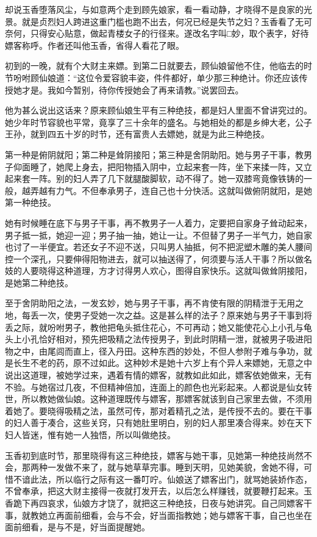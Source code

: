 \documentclass[a4paper,12pt,UTF8,twoside]{ctexbook}
\begin{document}
却说玉香堕落风尘，与如意两个走到顾先娘家，看一看动静，才晓得不是良家的光景。就是贞烈妇人跨进这重门槛也跑不出去，何况已经是失节之妇？玉香看了无可奈何，只得安心贴意，做起青楼女子的行径来。遂改名字叫□妙，取个表字，好待嫖客称呼。作者还叫他玉香，省得人看花了眼。

初到的一晚，就有个大财主来嫖。到第二日就要去，顾仙娘留他不住，他临去的时节吩咐顾仙娘道：“这位令爱容貌丰姿，件件都好，单少那三种绝计。你还应该传授她才是。我如今暂别，待你传授她会了再来请教。”说罢回去。

他为甚么说出这话来？原来顾仙娘生平有三种绝技，都是妇人里面不曾讲究过的。她少年时节容貌也平常，竟享了三十余年的盛名。与她相处的都是乡绅大老，公子王孙，就到四五十岁的时节，还有富贵人去嫖她，就是为此三种绝技。

第一种是俯阴就阳；第二种是耸阴接阳；第三种是舍阴助阳。她与男子干事，教男子仰面睡了，她爬上身去，把阳物插入阴中，立起来套一阵，坐下来揉一阵，又立起来套一阵。别的妇人弄了几下就腿酸脚软，动不得了。她一双膝弯竟像铁铸的一般，越弄越有力气。不但奉承男子，连自己也十分快活。这就叫做俯阴就阳，是她第一种绝技。

她有时候睡在底下与男子干事，再不教男子一人着力，定要把自家身子耸动起来，男子抵一抵，她迎一迎；男子抽一抽，她让一让。不但替了男子一半气力，她自家也讨了一半便宜。若还女子不迎不送，只叫男人抽抵，何不把泥塑木雕的美人腰间控一个深孔，只要伸得阳物进去，就可以抽送得了，何须要与活人干事？所以做名妓的人要晓得这种道理，方才讨得男人欢心，图得自家快乐。这就叫做耸阴接阳，是她第二种绝技。

至于舍阴助阳之法，一发玄妙，她与男子干事，再不肯使有限的阴精泄于无用之地，每丢一次，使男子受她一次之益。这是甚么样的法子？原来她与男子干事到将丢之际，就吩咐男子，教他把龟头抵住花心，不可再动；她又能使花心上小孔与龟头上小孔恰好相对，预先把吸精之法传授男子，到此时阴精一泄，就被男子吸进阳物之中，由尾闾而直上，径入丹田。这种东西的妙处，不但人参附子难与争功，就是长生不老的药，原不过如此。这种妙术是她十六岁上有个异人来嫖她，无意之中说出这道理，被她学过来，遇着有情的嫖客，就教如此如此，嫖客依她做来，无有不验。与她宿过几夜，不但精神倍加，连面上的颜色也光彩起来。人都说是仙女转世，所以教她做仙娘。这种道理既传与嫖客，那嫖客就该到自己家里去做，不须用着她了。要晓得吸精之法，虽然可传，那对着精孔之法，是传授不去的。要在干事的妇人善于凑合，这些关窍，只有她肚里明白，别的妇人那里凑合得来。妙在天下妇人皆迷，惟有她一人独悟，所以叫做绝技。

玉香初到底时节，那里晓得有这三种绝技，嫖客与她干事，见她第一种绝技尚然不会，那两种一发做不来了，就与她草草完事。睡到天明，见她美貌，舍她不得，可惜不谙此法，所以临行之际有这一番叮咛。仙娘送了嫖客出门，就骂她装娇作态，不曾奉承，把这大财主接得一夜就打发开去，以后怎么样赚钱，就要鞭打起来。玉香跪下再四哀求，仙娘方才饶了，就把这三种绝技，日夜与她讲究。自己同嫖客干事，就教她立再面前细看，会与不会，好当面指教她；她与嫖客干事，自己也坐在面前细看，是与不是，好当面提醒她。
\end{document}
